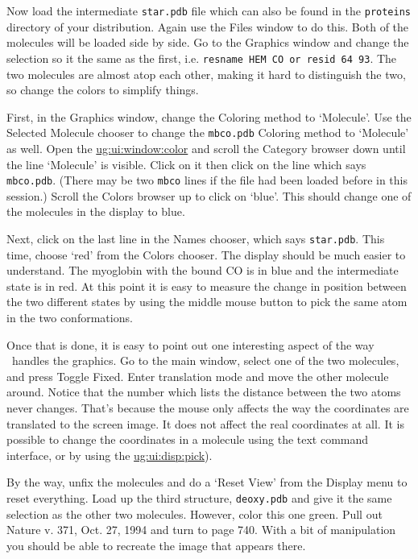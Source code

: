 Now load the intermediate {\tt star.pdb} file which can also be found
in the {\tt proteins} directory of your distribution. Again use the
Files window to do this.  Both of the molecules will be loaded side by
side.  Go to the Graphics window and change the selection so it the same
as the first, i.e. {\tt resname HEM CO or resid 64 93}.  The two
molecules are almost atop each other, making it hard to distinguish
the two, so change the colors to simplify things.

First, in the {\sf Graphics} window, change the {\sf Coloring method} to
`Molecule'.  Use the {\sf Selected Molecule} chooser to change the
{\tt mbco.pdb} {\sf Coloring method} to `Molecule' as well.  Open the
\hyperref{{\sf Color} window}{{\sf Color} window [\S }{]}{ug:ui:window:color}
and scroll the {\sf Category} browser down until the line `Molecule'
is visible.  Click on it then click on the line which says {\tt
mbco.pdb}.  (There may be two {\tt mbco} lines if the file had been loaded
before in this session.)  Scroll the {\sf Colors} browser up to click
on `blue'.  This should change one of the molecules in the display to
blue. 

Next, click on the last line in the {\sf Names} chooser, which says
{\tt star.pdb}.  This time, choose `red' from the {\sf Colors}
chooser.
The display should be much easier to understand.  The myoglobin with
the bound CO is in blue and the intermediate state is in red.  At this
point it is easy to measure the change in position between the two
different states by using the middle mouse button to pick the same
atom in the two conformations.  

Once that is done, it is easy to point out one interesting aspect of
the way \VMD\ handles the graphics.  Go to the main window, select one of
the two molecules, and press {\sf Toggle Fixed}.  Enter translation
mode and move the other molecule around.  Notice that the number which
lists the distance between the two atoms never changes.  That's
because the mouse only affects the way the coordinates are translated
to the screen image.  It does not affect the real coordinates at all.
It is possible to change the coordinates in a molecule using the text
command interface, or by using the 
\hyperref{atom move pick modes}{atom move pick modes [\S }{]}{ug:ui:disp:pick}).

By the way, unfix the molecules and do a `Reset View' from the Display
menu to reset everything.  Load up the third structure, {\tt deoxy.pdb} 
and give it the same selection as the other two molecules.
However, color this one green.  Pull out Nature v. 371, Oct. 27, 1994
and turn to page 740.  With a bit of manipulation you should be able
to recreate the image that appears there.

